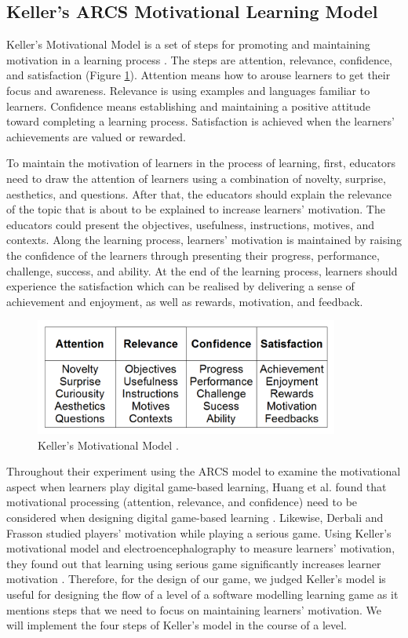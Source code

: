 \documentclass[12pt, a4paper]{report}
\begin{document}
\subsection{Keller's ARCS Motivational Learning Model}
Keller's Motivational Model is a set of steps for promoting and maintaining motivation in a learning process \cite{keller2010motivational}. The steps are attention, relevance, confidence, and satisfaction (Figure \ref{keller}). Attention means how to arouse learners to get their focus and awareness. Relevance is using examples and languages familiar to learners. Confidence means establishing and maintaining a positive attitude toward completing a learning process. Satisfaction is achieved when the learners' achievements are valued or rewarded. 

To maintain the motivation of learners in the process of learning, first, educators need to draw the attention of learners using a combination of novelty, surprise, aesthetics, and questions. After that, the educators should explain the relevance of the topic that is about to be explained to increase learners' motivation. The educators could present the objectives, usefulness, instructions, motives, and contexts. Along the learning process, learners' motivation is maintained by raising the confidence of the learners through presenting their progress, performance, challenge, success, and ability. At the end of the learning process, learners should experience the satisfaction which can be realised by delivering a sense of achievement and enjoyment, as well as rewards, motivation, and feedback.

\begin{figure}[ht]
\centering
\includegraphics[width=10cm]{keller}
\caption{Keller's Motivational Model \cite{keller2010motivational}.}
\label{keller}
\end{figure}

Throughout their experiment using the ARCS model to examine the motivational aspect when learners play digital game-based learning, Huang et al. found that motivational processing (attention, relevance, and confidence) need to be considered when designing digital game-based learning \cite{huang2010sustaining}. Likewise, Derbali and Frasson studied players' motivation while playing a serious game. Using Keller's motivational model and electroencephalography to measure learners' motivation, they found out that learning using serious game significantly increases learner motivation \cite{derbali2010players}. Therefore, for the design of our game, we judged Keller's model is useful for designing the flow of a level of a software modelling learning game as it mentions steps that we need to focus on maintaining learners' motivation. We will implement the four steps of Keller's model in the course of a level.\\
\end{document}
